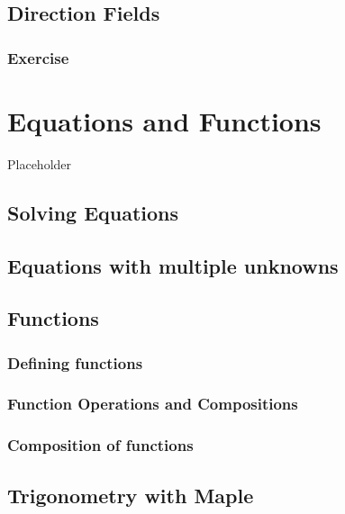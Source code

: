 \documentclass[
]{book}
\theoremstyle{definition}
\theoremstyle{definition}
\theoremstyle{definition}
\theoremstyle{definition}
\theoremstyle{remark}
\begin{document}
\section{Direction Fields}\label{direction-fields}

\subsection{Exercise}\label{exercise-10}

\chapter{Equations and Functions}\label{equations-and-functions}

Placeholder

\section{Solving Equations}\label{solving-equations}

\section{Equations with multiple unknowns}\label{equations-with-multiple-unknowns}

\section{Functions}\label{functions}

\subsection{Defining functions}\label{defining-functions}

\subsection{Function Operations and Compositions}\label{function-operations-and-compositions}

\subsection{Composition of functions}\label{composition-of-functions}

\section{Trigonometry with Maple}\label{trigonometry-with-maple}
\end{document}
